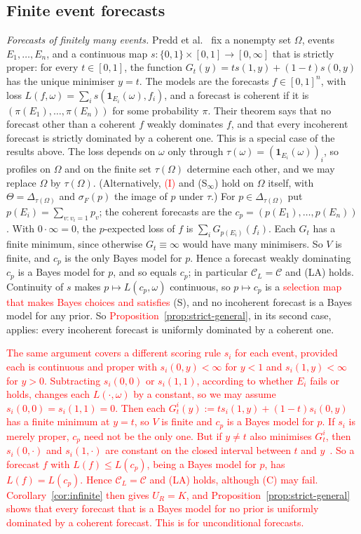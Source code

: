 \documentclass[11pt]{article}
\theoremstyle{definition}
\theoremstyle{remark}
\newcommand{\C}{\mathcal C}
\newcommand{\one}{\mathbf 1}
\begin{document}
\subsection{Finite event forecasts}\label{sec:forecasts}
\emph{Forecasts of finitely many events.} Predd et al.~\cite[Theorem~1]{Predd} fix a nonempty set $\Omega$, events $E_1,\dots,E_n$, and a continuous map $s:\{0,1\}\times[0,1]\to[0,\infty]$ that is strictly proper: for every $t\in[0,1]$, the function $G_t(y)=ts(1,y)+(1-t)s(0,y)$ has the unique minimiser $y=t$. The models are the forecasts $f\in[0,1]^n$, with loss $L(f,\omega)=\sum_is(\one_{E_i}(\omega),f_i)$, and a forecast is coherent if it is $(\pi(E_1),\dots,\pi(E_n))$ for some probability $\pi$. Their theorem says that no forecast other than a coherent $f$ weakly dominates $f$, and that every incoherent forecast is strictly dominated by a coherent one. This is a special case of the results above. The loss depends on $\omega$ only through $\tau(\omega)=(\one_{E_i}(\omega))_i$, so profiles on $\Omega$ and on the finite set $\tau(\Omega)$ determine each other, and we may replace $\Omega$ by $\tau(\Omega)$. (Alternatively, \textcolor{red}{(I)} and (S$_\infty$) hold on $\Omega$ itself, with $\Theta=\Delta_{\tau(\Omega)}$ and $\sigma_F(p)$ the image of $p$ under $\tau$.) For $p\in\Delta_{\tau(\Omega)}$ put $p(E_i)=\sum_{v:v_i=1}p_v$; the coherent forecasts are the $c_p=(p(E_1),\dots,p(E_n))$. With $0\cdot\infty=0$, the $p$-expected loss of $f$ is $\sum_iG_{p(E_i)}(f_i)$. Each $G_t$ has a finite minimum, since otherwise $G_t\equiv\infty$ would have many minimisers. So $V$ is finite, and $c_p$ is the only Bayes model for $p$. Hence a forecast weakly dominating $c_p$ is a Bayes model for $p$, and so equals $c_p$; in particular $\C_L=\C$ and (LA) holds. Continuity of $s$ makes $p\mapsto L(c_p,\omega)$ continuous, so $p\mapsto c_p$ is a \textcolor{red}{selection map that makes Bayes choices and satisfies} (S), and no incoherent forecast is a Bayes model for any prior. So \textcolor{red}{Proposition~\ref{prop:strict-general}}, in its second case, applies: every incoherent forecast is uniformly dominated by a coherent one.

\textcolor{red}{The same argument covers a different scoring rule $s_i$ for each event, provided each is continuous and proper with $s_i(0,y)<\infty$ for $y<1$ and $s_i(1,y)<\infty$ for $y>0$. Subtracting $s_i(0,0)$ or $s_i(1,1)$, according to whether $E_i$ fails or holds, changes each $L(\cdot,\omega)$ by a constant, so we may assume $s_i(0,0)=s_i(1,1)=0$. Then each $G^i_t(y):=ts_i(1,y)+(1-t)s_i(0,y)$ has a finite minimum at $y=t$, so $V$ is finite and $c_p$ is a Bayes model for $p$. If $s_i$ is merely proper, $c_p$ need not be the only one. But if $y\ne t$ also minimises $G^i_t$, then $s_i(0,\cdot)$ and $s_i(1,\cdot)$ are constant on the closed interval between $t$ and $y$~\cite[Lemma~5]{SSK09}. So a forecast $f$ with $L(f)\le L(c_p)$, being a Bayes model for $p$, has $L(f)=L(c_p)$. Hence $\C_L=\C$ and (LA) holds, although (C) may fail. Corollary~\ref{cor:infinite} then gives $U_R=K$, and Proposition~\ref{prop:strict-general} shows that every forecast that is a Bayes model for no prior is uniformly dominated by a coherent forecast. This is \cite[Theorem~2, Conclusion~3]{SSK09} for unconditional forecasts.}
\end{document}
